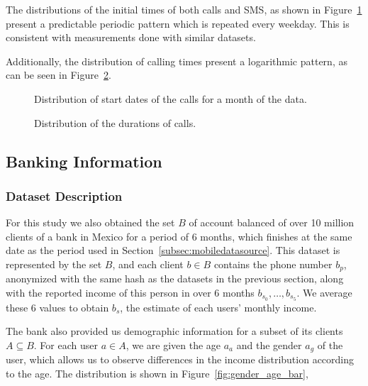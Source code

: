 The distributions of the initial times of both calls and SMS, as shown in Figure~\ref{fig:callsmsstartdatetime} present a predictable periodic pattern which is repeated every weekday. This is consistent with measurements done with similar datasets.

Additionally, the distribution of calling times present a logarithmic pattern, as can be seen in Figure~\ref{fig:callduration}.

\begin{figure}
\centering
{}
\caption{Distribution of start dates of the calls for a month of the data.}
\label{fig:callsmsstartdatetime}
\end{figure}

\begin{figure}
\centering
{}
\caption{Distribution of the durations of calls.}
\label{fig:callduration}
\end{figure}

\subsection{Banking Information}

\subsubsection{Dataset Description}

For this study we also obtained the set $B$ of account balanced of over 10 million clients of a bank in Mexico for a period of 6 months, which finishes at the same date as the period used in Section~\ref{subsec:mobiledatasource}. This dataset is represented by the set $B$, and each client $b \in B$ contains the phone number $b_p$, anonymized with the same hash as the datasets in the previous section, along with the reported income of this person in over 6 months $b_{s_0}, \ldots, b_{s_5}$. We average these 6 values to obtain $b_s$, the estimate of each users' monthly income.

The bank also provided us demographic information for a subset of its clients $A \subseteq B$. For each user $a \in A$, we are given the age $a_a$ and the gender $a_g$ of the user, which allows us to observe differences in the income distribution according to the age. The distribution is shown in Figure~\ref{fig:gender_age_bar}, 

